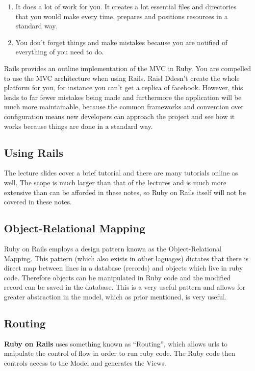 \documentclass[11pt]{article}
\begin{document}
\begin{enumerate}
  \item It does a lot of work for you. It creates a lot essential files and directories that you would make every time, prepares and positions resources in a standard way.
  \item You don't forget things and make mistakes because you are notified of everything of you need to do.
\end{enumerate}

Rails provides an outline implementation of the MVC in Ruby. You are compelled to use the MVC architecture when using Rails. Raisl Ddesn’t create the whole platform for you, for instance you can’t get a replica of facebook. However, this leads to far fewer mistakes being made and furthermore the application will be much more maintainable, because the common frameworks and convention over configuration means new developers can approach the project and see how it works because things are done in a standard way.

\subsection{Using Rails}
The lecture slides cover a brief tutorial and there are many tutorials online as well. The scope is much larger than that of the lectures and is much more extensive than can be afforded in these notes, so Ruby on Rails itself will not be covered in these notes.

\subsection{Object-Relational Mapping}
Ruby on Rails employs a design pattern known as the Object-Relational Mapping. This pattern (which also exists in other laguages) dictates that there is direct map between lines in a database (records) and objects which live in ruby code. Therefore objects can be manipulated in Ruby code and the modified record can be saved in the database. This is a very useful pattern and allows for greater abstraction in the model, which as prior mentioned, is very useful.

\subsection{Routing}
\textbf{Ruby on Rails} uses something known as ``Routing'', which allows urls to maipulate the control of flow in order to run ruby code. The Ruby code then controls access to the Model and generates the Views.
\end{document}
